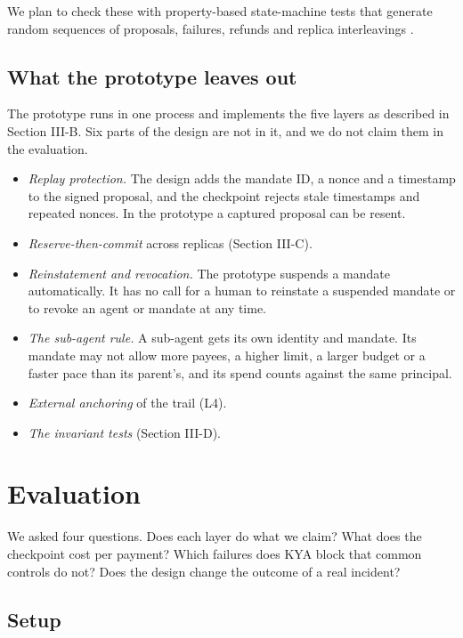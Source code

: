 \documentclass[conference]{IEEEtran}
\begin{document}
We plan to check these with property-based state-machine tests that generate random sequences of proposals, failures, refunds and replica interleavings \cite{b30}.

\subsection{What the prototype leaves out}

The prototype runs in one process and implements the five layers as described in Section III-B. Six parts of the design are not in it, and we do not claim them in the evaluation.

\begin{itemize}
\item
  \emph{Replay protection.} The design adds the mandate ID, a nonce and a timestamp to the signed proposal, and the checkpoint rejects stale timestamps and repeated nonces. In the prototype a captured proposal can be resent.
\item
  \emph{Reserve-then-commit} across replicas (Section III-C).
\item
  \emph{Reinstatement and revocation.} The prototype suspends a mandate automatically. It has no call for a human to reinstate a suspended mandate or to revoke an agent or mandate at any time.
\item
  \emph{The sub-agent rule.} A sub-agent gets its own identity and mandate. Its mandate may not allow more payees, a higher limit, a larger budget or a faster pace than its parent's, and its spend counts against the same principal.
\item
  \emph{External anchoring} of the trail (L4).
\item
  \emph{The invariant tests} (Section III-D).
\end{itemize}

\section{Evaluation}

We asked four questions. Does each layer do what we claim? What does the checkpoint cost per payment? Which failures does KYA block that common controls do not? Does the design change the outcome of a real incident?

\subsection{Setup}
\end{document}
